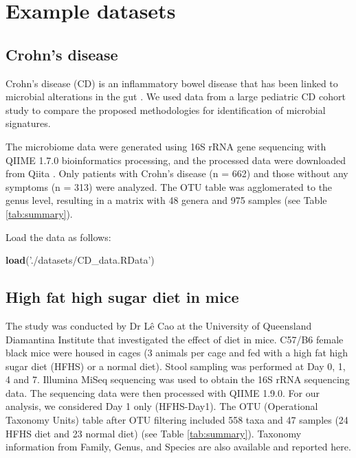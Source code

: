 \documentclass[openany]{book}
\newenvironment{Shaded}{\begin{snugshade}}{\end{snugshade}}
\newcommand{\KeywordTok}[1]{\textcolor[rgb]{0.13,0.29,0.53}{\textbf{#1}}}
\newcommand{\StringTok}[1]{\textcolor[rgb]{0.31,0.60,0.02}{#1}}
\newcommand{\NormalTok}[1]{#1}
\begin{document}
\section{Example datasets}\label{example-datasets}

\subsection{Crohn's disease}\label{crohns-disease}

Crohn's disease (CD) is an inflammatory bowel disease that has been
linked to microbial alterations in the gut
\citep{gevers2014treatment, oyri2015dysbiotic}. We used data from a
large pediatric CD cohort study \citep{gevers2014treatment} to compare
the proposed methodologies for identification of microbial signatures.

The microbiome data were generated using 16S rRNA gene sequencing with
QIIME 1.7.0 bioinformatics processing, and the processed data were
downloaded from Qiita \citep{rivera2018balances}. Only patients with
Crohn's disease (n = 662) and those without any symptoms (n = 313) were
analyzed. The OTU table was agglomerated to the genus level, resulting
in a matrix with 48 genera and 975 samples (see Table
\ref{tab:summary}).

Load the data as follows:

\begin{Shaded}
\begin{Highlighting}[]
\KeywordTok{load}\NormalTok{(}\StringTok{'./datasets/CD_data.RData'}\NormalTok{)}
\end{Highlighting}
\end{Shaded}

\subsection{High fat high sugar diet in
mice}\label{high-fat-high-sugar-diet-in-mice}

The study was conducted by Dr Lê Cao at the University of Queensland
Diamantina Institute that investigated the effect of diet in mice.
C57/B6 female black mice were housed in cages (3 animals per cage and
fed with a high fat high sugar diet (HFHS) or a normal diet). Stool
sampling was performed at Day 0, 1, 4 and 7. Illumina MiSeq sequencing
was used to obtain the 16S rRNA sequencing data. The sequencing data
were then processed with QIIME 1.9.0. For our analysis, we considered
Day 1 only (HFHS-Day1). The OTU (Operational Taxonomy Units) table after
OTU filtering included 558 taxa and 47 samples (24 HFHS diet and 23
normal diet) (see Table \ref{tab:summary}). Taxonomy information from
Family, Genus, and Species are also available and reported here.
\end{document}
